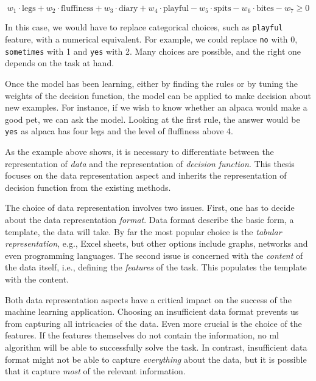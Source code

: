 $$ w_1 \cdot \text{legs} + w_2 \cdot \text{fluffiness} + w_3 \cdot \text{diary} + w_4 \cdot \text{playful} - w_5 \cdot \text{spits} - w_6 \cdot \text{bites} - w_7 \geq 0$$

In this case, we would have to replace categorical choices, such as \texttt{playful} feature, with a numerical equivalent.
For example, we could replace \texttt{no} with 0, \texttt{sometimes} with 1 and \texttt{yes} with 2.
Many choices are possible, and the right one depends on the task at hand.


Once the model has been learning, either by finding the rules or by tuning the weights of the decision function, the model can be applied to make decision about new examples.
For instance, if we wish to know whether an alpaca would make a good pet, we can ask the model.
Looking at the first rule, the answer would be \texttt{yes} as alpaca has four legs and the level of fluffiness above 4. 



As the example above shows, it is necessary to differentiate between the representation of \textit{data} and the representation of  \textit{decision function}.
This thesis focuses on the data representation aspect and inherits the representation of decision function from the existing methods.





The choice of data representation involves two issues.
First, one has to decide about the data representation \textit{format}.
Data format describe the basic form, a template, the data will take.
By far the most popular choice is the \textit{tabular representation}, e.g., Excel sheets, but other options include graphs, networks and even programming languages.
The second issue is concerned with the \textit{content} of the data itself, i.e., defining the \textit{features} of the task.
This populates the template with the content.



Both data representation aspects have a critical impact on the success of the machine learning application.
Choosing an insufficient data format prevents us from capturing all intricacies of the data.
Even more crucial is the choice of the features.
If the features themselves do not contain the information, no \gls{ml} algorithm will be able to successfully solve the task.
In contrast, insufficient data format might not be able to capture \textit{everything} about the data, but it is possible that it capture \textit{most} of the relevant information.



